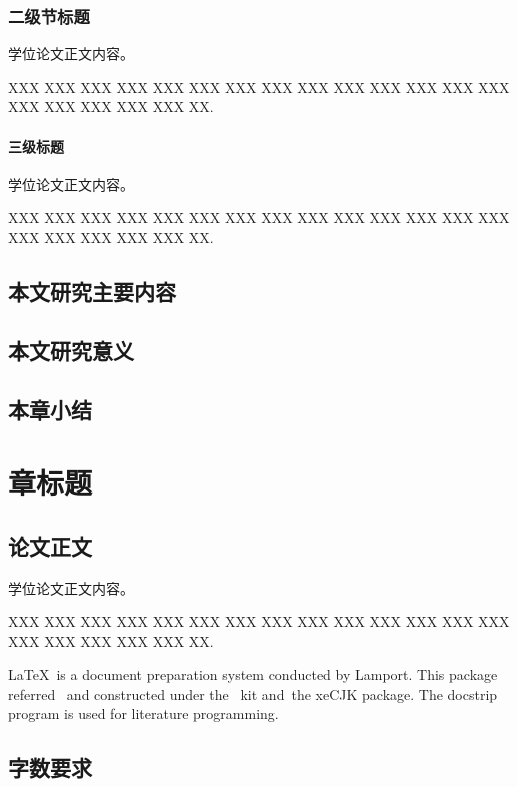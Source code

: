 \documentclass[mode = thesis, fontset = lxgw]{westlakethesis}
\begin{document}
\subsection{二级节标题}

学位论文正文内容。

XXX XXX XXX XXX XXX XXX XXX XXX XXX XXX XXX XXX XXX XXX XXX
XXX XXX XXX XXX XX.

\subsubsection{三级标题}

学位论文正文内容。

XXX XXX XXX XXX XXX XXX XXX XXX XXX XXX XXX XXX XXX XXX XXX
XXX XXX XXX XXX XX.

\section{本文研究主要内容}

\section{本文研究意义}

\section{本章小结}

\chapter{章标题}

\section{论文正文}

学位论文正文内容。

XXX XXX XXX XXX XXX XXX XXX XXX XXX XXX XXX XXX XXX XXX XXX
XXX XXX XXX XXX XX.

\LaTeX\ is a document preparation system conducted by
Lamport\cite{lamport1994document}. This package
referred~\parencite{knuth1984texbook, usrguide, clsguide, fntguide} and
constructed under the \CTeX\ kit\cite{ctex}
and~the \textsf{xeCJK} package\cite{xeCJK}.
The \textsf{docstrip} program\cite{mittelbach1994docstrip} is used for
literature programming.

\section{字数要求}
\end{document}
